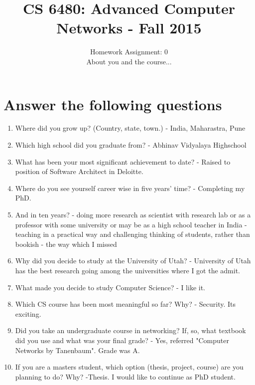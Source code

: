 \documentclass{article}
\title{CS 6480: Advanced Computer Networks - Fall 2015}
\author{Homework Assignment: 0\\
About you and the course...
}
\date{}
\begin{document}
\maketitle

\section*{Answer the following questions}

\begin{enumerate}

\item Where did you grow up? (Country, state, town.) - India, Maharastra, Pune

\item Which high school did you graduate from? - Abhinav Vidyalaya Highschool

\item What has been your most significant achievement to date? - Raised to position of Software Architect in Deloitte.

\item Where do you see yourself career wise in five years' time? - Completing my PhD.

\item And in ten years? - doing more research as scientist with research lab or as a professor with some university or may be as a high school teacher in India - teaching in a practical way and challenging thinking of students, rather than bookish - the way which I missed

\item Why did you decide to study at the University of Utah? - University of Utah has the best research going among the universities where I got the admit.

\item What made you decide to study Computer Science? - I like it.

\item Which CS course has been most meaningful so far? Why? - Security. Its exciting.

\item Did you take an undergraduate course in networking? If, so,
what textbook did you use and what was your final grade? - Yes, referred "Computer Networks by Tanenbaum". Grade was A. 

\item If you are a masters student, which option (thesis, project, course)
are you planning to do? Why? -Thesis. I would like to continue as PhD student.


\end{enumerate}
\end{document}
